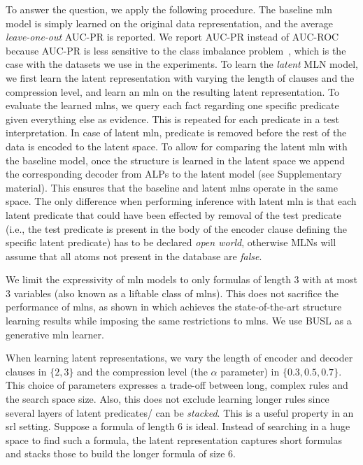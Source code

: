 To answer the question, we apply the following procedure.
The baseline \gls{mln} model is simply learned on the original data representation, and the average \textit{leave-one-out} AUC-PR is reported.
We report AUC-PR instead of AUC-ROC because AUC-PR is less sensitive to the class imbalance problem~\cite{Davis:2006:RPR:1143844.1143874}, which is the case with the datasets we use in the experiments.
To learn the \textit{latent} MLN model, we first learn the latent representation with  varying the length of clauses and the compression level, and learn an \gls{mln} on the resulting latent representation.
To evaluate the learned \gls{mln}s, we query each fact regarding one specific predicate given everything else as evidence.
This is repeated for each predicate in a test interpretation.
In case of latent \gls{mln}, predicate is removed before the rest of the data is encoded to the latent space.
To allow for comparing the latent \gls{mln} with the baseline model, once the structure is learned in the latent space we append the corresponding decoder from ALPs to the latent model (see Supplementary material).
This ensures that the baseline and latent \gls{mln}s operate in the same space.
The only difference when performing inference with latent \gls{mln} is that each latent predicate that could have been effected by removal of the test predicate (i.e., the test predicate is present in the body of the encoder clause defining the specific latent predicate) has to be declared \textit{open world}, otherwise MLNs will assume that all atoms not present in the database are \textit{false}.


 We limit the expressivity of \gls{mln} models to only formulas of length 3 with at most 3 variables (also known as a liftable class of \gls{mln}s).
This does not sacrifice the performance of \gls{mln}s, as shown in \cite{VanHaaren2016} which achieves the state-of-the-art structure learning results while imposing the same restrictions to \gls{mln}s.
We use BUSL \cite{mihalkova:icml07} as a generative \gls{mln} learner.




When learning latent representations, we vary the length of encoder and decoder clauses in $\{2,3\}$ and the compression level (the $\alpha$ parameter) in $\{0.3, 0.5, 0.7\}$.
This choice of parameters expresses a trade-off between long, complex rules and the search space size.
Also, this does not exclude learning longer rules since several layers of latent predicates/ can be \textit{stacked}.
This is a useful property in an \gls{srl} setting.
Suppose a formula of length 6 is ideal.
Instead of searching in a huge space to find such a formula, the latent representation captures short formulas and stacks those to build the longer formula of size 6.




